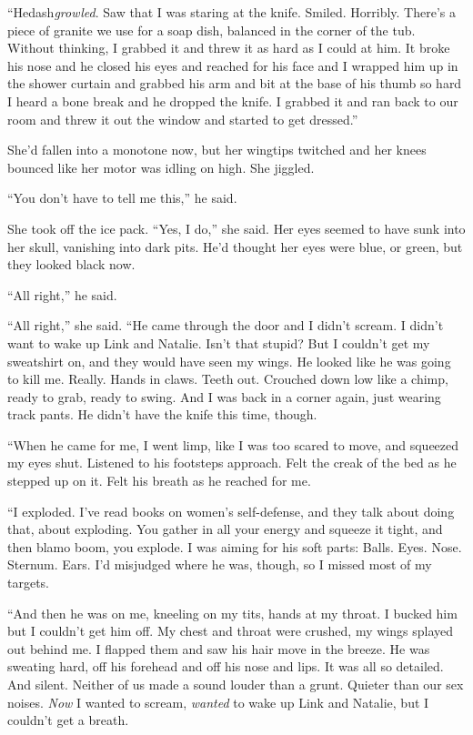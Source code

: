``Hedash{}\textit{growled}.  Saw that I was staring at the knife. 
Smiled.  Horribly.  There's a piece of granite we use for a soap dish,
balanced in the corner of the tub.  Without thinking, I grabbed it and
threw it as hard as I could at him.  It broke his nose and he closed
his eyes and reached for his face and I wrapped him up in the shower
curtain and grabbed his arm and bit at the base of his thumb so hard I
heard a bone break and he dropped the knife.  I grabbed it and ran
back to our room and threw it out the window and started to get
dressed.''

She'd fallen into a monotone now, but her wingtips twitched and her
knees bounced like her motor was idling on high.  She jiggled.

``You don't have to tell me this,'' he said.

She took off the ice pack.  ``Yes, I do,'' she said.  Her eyes seemed
to have sunk into her skull, vanishing into dark pits.  He'd thought
her eyes were blue, or green, but they looked black now.

``All right,'' he said.

``All right,'' she said.  ``He came through the door and I didn't
scream.  I didn't want to wake up Link and Natalie.  Isn't that
stupid?  But I couldn't get my sweatshirt on, and they would have seen
my wings.  He looked like he was going to kill me.  Really.  Hands in
claws.  Teeth out.  Crouched down low like a chimp, ready to grab,
ready to swing.  And I was back in a corner again, just wearing track
pants.  He didn't have the knife this time, though.

``When he came for me, I went limp, like I was too scared to move, and
squeezed my eyes shut.  Listened to his footsteps approach.  Felt the
creak of the bed as he stepped up on it.  Felt his breath as he
reached for me.

``I exploded.  I've read books on women's self-defense, and they talk
about doing that, about exploding.  You gather in all your energy and
squeeze it tight, and then blamo boom, you explode.  I was aiming for
his soft parts:  Balls.  Eyes.  Nose.  Sternum.  Ears.  I'd misjudged
where he was, though, so I missed most of my targets.

``And then he was on me, kneeling on my tits, hands at my throat.  I
bucked him but I couldn't get him off.  My chest and throat were
crushed, my wings splayed out behind me.  I flapped them and saw his
hair move in the breeze.  He was sweating hard, off his forehead and
off his nose and lips.  It was all so detailed.  And silent.  Neither
of us made a sound louder than a grunt.  Quieter than our sex noises. 
\textit{Now} I wanted to scream, \textit{wanted} to wake up Link and
Natalie, but I couldn't get a breath.

